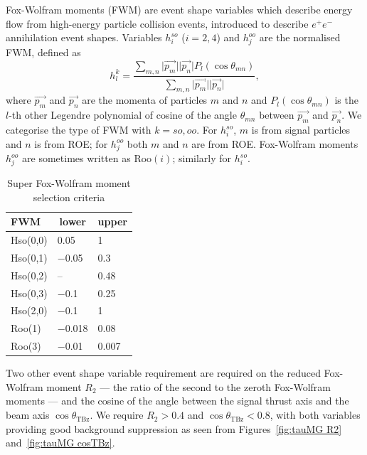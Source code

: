 \documentclass[12pt]{thesis}  %
\begin{document}
Fox-Wolfram moments (FWM) are event shape variables which describe energy flow from high-energy particle collision events, introduced to describe $e^+ e^-$ annihilation event shapes. Variables $h^{so}_i$ ($i=2,4$) and $h^{oo}_j$ are the normalised FWM, defined as
\begin{equation}
h_l^k = \frac{\sum_{m,n}\lvert\vec{p_m}\rvert\lvert\vec{p_n}\rvert P_l(\cos\theta_{mn})}
{\sum_{m,n}\lvert\vec{p_m}\rvert\lvert\vec{p_n}\rvert},
\end{equation}
where $\vec{p_m}$ and $\vec{p_n}$ are the momenta of particles $m$ and $n$ and $P_l(\cos\theta_{mn})$ is the $l$-th other Legendre polynomial of cosine of the angle $\theta_{mn}$ between $\vec{p_m}$ and $\vec{p_n}$. We categorise the type of FWM with $k=so,oo$. For $h^{so}_i$, $m$ is from signal particles and $n$ is from ROE; for $h^{oo}_{j}$ both $m$ and $n$ are from ROE. Fox-Wolfram moments $h^{oo}_j$ are sometimes written as Roo$(i)$; similarly for $h^{so}_{i}$.

\begin{table}[h]
\centering
\begin{tabular}{lll}
\textbf{FWM} & \multicolumn{1}{c}{\textbf{lower}} & \multicolumn{1}{c}{\textbf{upper}} \\ \hline
Hso(0,0) & \num{0.05} & \num{1} \\
Hso(0,1) & \num{-0.05} & \num{0.3} \\
Hso(0,2) & -- & \num{0.48} \\
Hso(0,3) & \num{-0.1} & \num{0.25} \\
Hso(2,0) & \num{-0.1} & \num{1} \\
Roo(1) & \num{-0.018} & \num{0.08} \\
Roo(3) & \num{-0.01} & \num{0.007}
\end{tabular}
\caption{Super Fox-Wolfram moment selection criteria}
\label{my-label}
\end{table}

Two other event shape variable requirement are required on the reduced Fox-Wolfram moment $R_2$ --- the ratio of the second to the zeroth Fox-Wolfram moments --- and the cosine of the angle between the signal thrust axis and the beam axis $\cos\theta_{\text{TBz}}$. We require $R_2 > 0.4$ and $\cos\theta_{\text{TBz}} < 0.8$, with both variables providing good background suppression as seen from Figures~\ref{fig:tauMG R2} and~\ref{fig:tauMG cosTBz}.
\end{document}
